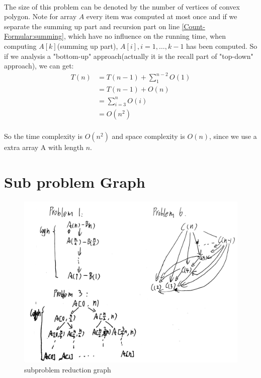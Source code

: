 \documentclass[]{article}
\begin{document}
            \paragraph{}The size of this problem can be denoted by the number of vertices of convex polygon. Note for array $A$ every item was computed at most once and if we separate the summing up part and recursion part on line \ref{Count-Formular:summing}, which have no influence on the running time, when computing $A[k]$(summing up part), $A[i],i = 1,\dots,k-1$ has been computed. So if we analysis a "bottom-up" approach(actually it is the recall part of "top-down" approach), we can get:
            \begin{align*}
            T(n) &= T(n-1) + \sum_{1}^{n-2} {O(1)} \\
                 &= T(n-1) + O(n) \\
                 &= \sum_{i=3}^{n} {O(i)} \\
                 &= O(n^2)
            \end{align*}
            \paragraph{} So the time complexity is $O(n^2)$ and space complexity is $O(n)$, since we use a extra array A with length $n$.
        
    \section{Sub problem Graph}
        \begin{figure}[H]
			\includegraphics[scale=0.3]{sub_problem.png}
			\caption{subproblem reduction graph}
		\end{figure}
\end{document}
